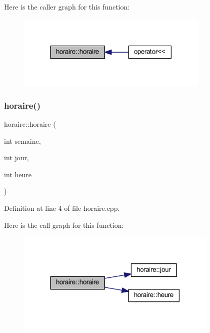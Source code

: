 Here is the caller graph for this function\+:\nopagebreak
\begin{figure}[H]
\begin{center}
\leavevmode
\includegraphics[width=261pt]{classhoraire_aa5f11a3d1a68b9ef98e6aed7e3773b29_icgraph}
\end{center}
\end{figure}
\hypertarget{classhoraire_a1a6d044450099f5e481188c4f51d41ea}{}\label{classhoraire_a1a6d044450099f5e481188c4f51d41ea} 
\subsubsection{\texorpdfstring{horaire()}{horaire()}\hspace{0.1cm}{\footnotesize\ttfamily [2/3]}}
{\footnotesize\ttfamily horaire\+::horaire (\begin{DoxyParamCaption}\item[{int}]{semaine,  }\item[{int}]{jour,  }\item[{int}]{heure }\end{DoxyParamCaption})}



Definition at line 4 of file horaire.\+cpp.

Here is the call graph for this function\+:\nopagebreak
\begin{figure}[H]
\begin{center}
\leavevmode
\includegraphics[width=273pt]{classhoraire_a1a6d044450099f5e481188c4f51d41ea_cgraph}
\end{center}
\end{figure}
\hypertarget{classhoraire_adbeac30f6f55e50ec7455a2bb52e7b3a}{}\label{classhoraire_adbeac30f6f55e50ec7455a2bb52e7b3a} 
